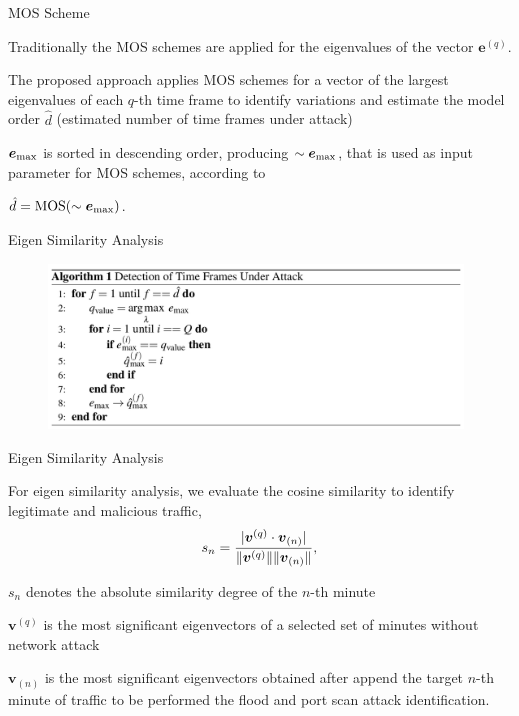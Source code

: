 \documentclass[newPxFont, numfooter, sectionpages]{beamer}
\DeclarePairedDelimiter\abs{\lvert}{\rvert}%
\DeclarePairedDelimiter\norm{\lVert}{\rVert}%
\begin{document}
\begin{frame}{MOS Scheme}
	
	Traditionally the MOS schemes are applied for the eigenvalues of the vector $\boldsymbol{e}^{(q)}$. 

	The proposed approach applies MOS schemes for a vector of the largest eigenvalues of each $q$-th time frame to identify variations and estimate the model order $\hat{d}$ (estimated number of time frames under attack)

	$\boldsymbol{e}_{\rm max}$ is sorted in descending order, producing $\sim\boldsymbol{e}_{\rm max}$, that is used as input parameter for MOS schemes, according to 

	$\hat{d} = \rm{MOS}(\sim\boldsymbol{e}_{\rm max})$. 

\end{frame}
\begin{frame}{Eigen Similarity Analysis}
	
	\begin{figure}[h!]
	     \centering 
	     \includegraphics[width=11cm]{alg.png}
	     \label{fig:2_fig9}
	\end{figure}

\end{frame}
\begin{frame}{Eigen Similarity Analysis}
	
	For eigen similarity analysis, we evaluate the cosine similarity to identify legitimate and malicious traffic,
	\begin{equation}
		\label{eq:eq11}
		s_n = \frac{\abs{\boldsymbol{v}^{(q)} \cdot \boldsymbol{v}_{(n)}}}{\norm{\boldsymbol{v}^{(q)}}\norm{\boldsymbol{v}_{(n)}}},
	\end{equation}

	$s_n$ denotes the absolute similarity degree of the $n$-th minute
	
	$\boldsymbol{v}^{(q)}$ is the most significant eigenvectors of a selected set of minutes without network attack

	$\boldsymbol{v}_{(n)}$ is the most significant eigenvectors obtained after append the target $n$-th minute of traffic to be performed the flood and port scan attack identification.

\end{frame}
\end{document}

